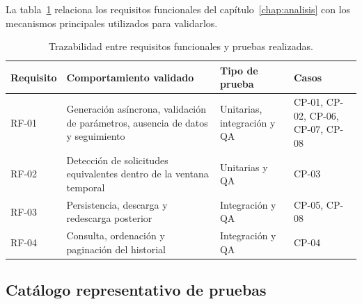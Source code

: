 \documentclass[11pt,a4paper,titlepage,oneside]{report}
\newcommand{\tfgtablestyle}{%
  \small
  \setlength{\tabcolsep}{4pt}%
  \renewcommand{\arraystretch}{1.15}%
  \rowcolors{2}{udcgray!08}{white}%
}
\begin{document}
La tabla~\ref{tab:trazabilidad-pruebas} relaciona los requisitos funcionales
del capítulo~\ref{chap:analisis} con los mecanismos principales utilizados para
validarlos.
\begin{table}[H]
  \centering
  \tfgtablestyle
  \caption{Trazabilidad entre requisitos funcionales y pruebas realizadas.}
  \label{tab:trazabilidad-pruebas}

  \begin{tabularx}{0.97\textwidth}
    {@{}p{}X p{}p{}@{}}

    \toprule
    \rowcolor{udcpink!20}

    \textbf{Requisito} &
    \textbf{Comportamiento validado} &
    \textbf{Tipo de prueba} &
    \textbf{Casos} \\

    \midrule

    RF-01 &
    Generación asíncrona, validación de parámetros, ausencia de datos y
    seguimiento &
    Unitarias, integración y QA &
    CP-01, CP-02, CP-06, CP-07, CP-08 \\

    RF-02 &
    Detección de solicitudes equivalentes dentro de la ventana temporal &
    Unitarias y QA &
    CP-03 \\

    RF-03 &
    Persistencia, descarga y redescarga posterior &
    Integración y QA &
    CP-05, CP-08 \\

    RF-04 &
    Consulta, ordenación y paginación del historial &
    Integración y QA &
    CP-04 \\

    \bottomrule
  \end{tabularx}

\end{table}

\subsection{Catálogo representativo de pruebas}
\end{document}
